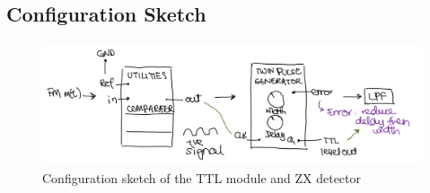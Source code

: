 \documentclass[11pt]{article}
\begin{document}
\subsection*{Configuration Sketch}
\begin{figure}[H]
    \centering
    \includegraphics[width=15cm]{W3Q5Config.jpeg}
    \caption{Configuration sketch of the TTL module and ZX detector}
    \label{fig:W3Q5Config}
\end{figure}

\newpage
\end{document}
